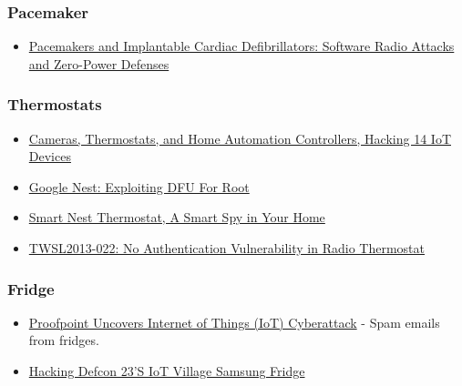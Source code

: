 \hypertarget{pacemaker}{%
\subsubsection{Pacemaker}\label{pacemaker}}

\begin{itemize}
\tightlist
\item
  \href{http://www.secure-medicine.org/public/publications/icd-study.pdf}{Pacemakers
  and Implantable Cardiac Defibrillators: Software Radio Attacks and
  Zero-Power Defenses}
\end{itemize}

\hypertarget{thermostats}{%
\subsubsection{Thermostats}\label{thermostats}}

\begin{itemize}
\tightlist
\item
  \href{https://www.iotvillage.org/slides_DC23/IoT11-slides.pdf}{Cameras,
  Thermostats, and Home Automation Controllers, Hacking 14 IoT Devices}
\item
  \href{https://blog.exploitee.rs/2014/google-nest-exploiting-dfu-for-root/}{Google
  Nest: Exploiting DFU For Root}
\item
  \href{https://www.blackhat.com/docs/us-14/materials/us-14-Jin-Smart-Nest-Thermostat-A-Smart-Spy-In-Your-Home.pdf}{Smart
  Nest Thermostat, A Smart Spy in Your Home}
\item
  \href{https://www.trustwave.com/Resources/Security-Advisories/Advisories/TWSL2013-022/?fid=3870}{TWSL2013-022:
  No Authentication Vulnerability in Radio Thermostat}
\end{itemize}

\hypertarget{fridge}{%
\subsubsection{Fridge}\label{fridge}}

\begin{itemize}
\tightlist
\item
  \href{http://investors.proofpoint.com/releasedetail.cfm?releaseid=819799}{Proofpoint
  Uncovers Internet of Things (IoT) Cyberattack} - Spam emails from
  fridges.
\item
  \href{https://www.pentestpartners.com/blog/hacking-defcon-23s-iot-village-samsung-fridge/}{Hacking
  Defcon 23'S IoT Village Samsung Fridge}
\end{itemize}

